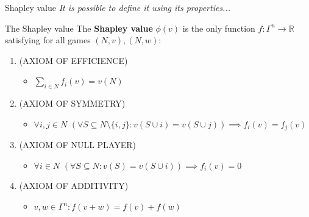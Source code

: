 \documentclass{beamer}
\begin{document}
\begin{frame}{Shapley value}
    \textit{It is possible to define it using its properties...}
	\pause
    \begin{block}{The Shapley value}
       The \textbf{Shapley value} $\phi(v)$ is the only function $f \colon \Gamma^n \to \mathbb{R}$ satisfying for all games $(N,v),(N,w)$:
        \begin{enumerate}
            \item<3-> (AXIOM OF EFFICIENCE)
            \begin{itemize}
                \item<4-> $\sum_{i \in N}f_i(v) = v(N)$
            \end{itemize}
            \item<3-> (AXIOM OF SYMMETRY)
            \begin{itemize}
                \item<5-> $\forall i,j \in N$ $(\forall S \subseteq N \setminus \{i,j\}: v(S \cup i) = v(S \cup j)) \implies f_i(v) = f_j(v)$
            \end{itemize}
            \item<3-> (AXIOM OF NULL PLAYER)
            \begin{itemize}
                \item<6-> $\forall i \in N$ $(\forall S \subseteq N: v(S) = v(S \cup i)) \implies f_i(v)=0$
            \end{itemize}
            \item<3-> (AXIOM OF ADDITIVITY)
            \begin{itemize}
                \item<7-> $v,w \in \Gamma^n: f(v+w)=f(v)+f(w)$
            \end{itemize}
        \end{enumerate}
        
    \end{block}
\end{frame}


\end{document}
